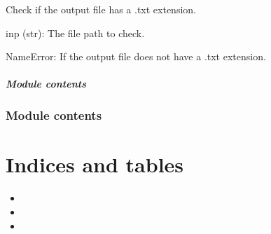 \documentclass[letterpaper,10pt,english]{sphinxmanual}
\begin{document}
\begin{fulllineitems}

\begin{fulllineitems}
\label{\detokenize{cometr.global_metrics:cometr.global_metrics.MSE.MSE.is_txt}}
\pysigstartsignatures
{}
\pysigstopsignatures
\sphinxAtStartPar
Check if the output file has a .txt extension.
\begin{description}
\sphinxAtStartPar
inp (str): The file path to check.

\sphinxAtStartPar
NameError: If the output file does not have a .txt extension.

\end{description}

\end{fulllineitems}


\end{fulllineitems}



\paragraph{Module contents}
\label{\detokenize{cometr.global_metrics:module-cometr.global_metrics}}\label{\detokenize{cometr.global_metrics:module-contents}}

\subsection{Module contents}
\label{\detokenize{cometr:module-cometr}}\label{\detokenize{cometr:module-contents}}

\chapter{Indices and tables}
\label{\detokenize{index:indices-and-tables}}\begin{itemize}
\item {} 
\sphinxAtStartPar
{}

\item {} 
\sphinxAtStartPar
{}

\item {} 
\sphinxAtStartPar
{}

\end{itemize}
\end{document}
